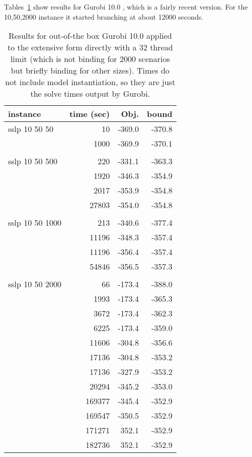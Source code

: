 \documentclass{article}
\begin{document}
Tables~\ref{tab:ef} show results for Gurobi 10.0 \cite{gurobi}, which is a fairly recent version.  For the 10,50,2000 instance it
started branching at about 12000 seconds.


\begin{table}
\begin{centering}
\begin{tabular}{lrrr}
\hline\hline
instance & time (sec) &   Obj.  & bound \\
\hline
sslp 10 50 50 & 10 & -369.0 & -370.8 \\
              & 1000 & -369.9 & -370.1 \\
\\
sslp 10 50 500 &  220 & -331.1 & -363.3 \\
               & 1920 & -346.3 & -354.9 \\
               & 2017 & -353.9 & -354.8 \\
               & 27803 & -354.0 & -354.8 \\
\\
sslp 10 50 1000 & 213 & -340.6 & -377.4 \\
                & 11196 & -348.3 & -357.4 \\
                & 11196 & -356.4 & -357.4 \\
                & 54846 & -356.5 & -357.3 \\
\\
sslp 10 50 2000 & 66 & -173.4 & -388.0 \\
                & 1993 & -173.4 & -365.3 \\
                & 3672 & -173.4 & -362.3 \\
                & 6225 & -173.4 & -359.0 \\
                & 11606 & -304.8 & -356.6 \\
                & 17136 & -304.8 & -353.2 \\
                & 17136 & -327.9 & -353.2 \\
                & 20294  & -345.2 & -353.0 \\
                & 169377 & -345.4 & -352.9 \\
                & 169547 & -350.5 & -352.9 \\
                &171271  & 352.1  & -352.9 \\
                &182736  & 352.1  & -352.9 \\
\hline\hline
\end{tabular}
\caption{Results for out-of-the box Gurobi 10.0 applied to the extensive form directly with a 32 thread limit (which is not binding for 2000 scenarios but briefly binding for other sizes). Times do not include model instantiation, so they are just the solve times output by Gurobi.\label{tab:ef}}
\end{centering}
\end{table}
\end{document}
